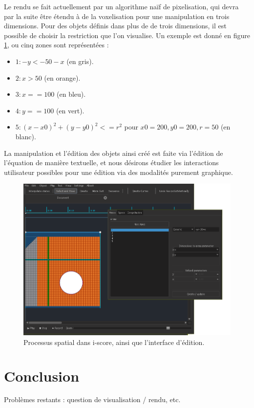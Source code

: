 \documentclass[french,12pt]{article}
\begin{document}
Le rendu se fait actuellement par un algorithme naïf de pixelisation, qui devra par la suite être étendu à de la voxelisation pour une manipulation en trois dimensions. Pour des objets définis dans plus de de trois dimensions, il est possible de choisir la restriction que l'on visualise. Un exemple est donné en figure \ref{fig.space.iscore}, ou cinq zones sont représentées : 
\begin{itemize}
    \item  $1: -y < -50 - x$ (en gris).
    \item $ 2: x > 50$  (en orange).
    \item  $3: x == 100$ (en bleu).
    \item  $4: y == 100$ (en vert).
    \item $5: (x - x0)^2 + (y - y0) ^2 <= r^2$ pour $x0 = 200, y0 = 200, r = 50 $ (en blanc).
\end{itemize}

La manipulation et l'édition des objets ainsi créé est faite via l'édition de l'équation de manière textuelle, et nous désirons étudier les interactions utilisateur possibles pour une édition via des modalités purement graphique. 

\begin{figure}[h]
    \centering
    \includegraphics[scale=0.5]{images/space.png}
    \caption{Processus spatial dans i-score, ainsi que l'interface d'édition.}
    \label{fig.space.iscore}
\end{figure} 

\section{Conclusion}

Problèmes restants : question de visualisation / rendu, etc.

\printbibliography
\end{document}
